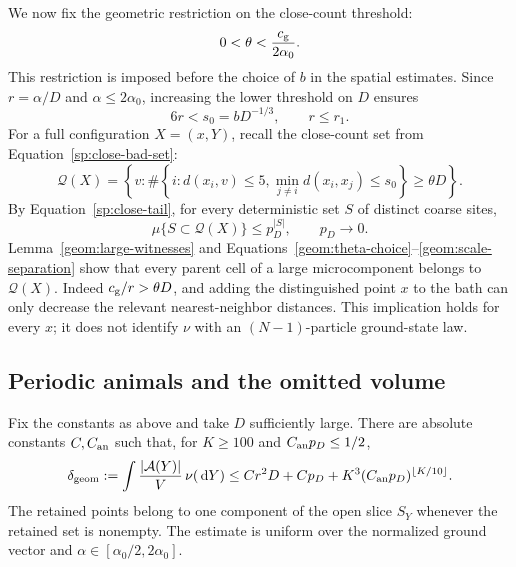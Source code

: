 We now fix the geometric restriction on the close-count threshold:
\begin{equation}\label{geom:theta-choice}
 0<\theta<\frac{c_{\rm g}}{2\alpha_0}.
\end{equation}
This restriction is imposed before the choice of $b$ in the spatial
estimates. Since $r=\alpha/D$ and $\alpha\le2\alpha_0$, increasing
the lower threshold on $D$ ensures
\begin{equation}\label{geom:scale-separation}
 6r<s_0=bD^{-1/3},\qquad r\le r_1.
\end{equation}
For a full configuration $X=(x,Y)$, recall the close-count set from
Equation~\eqref{sp:close-bad-set}:
\begin{equation}\label{geom:coarse-bad-set}
 \mathcal Q(X)
 =\left\{v:\#\left\{i:d(x_i,v)\le5,
                    \min_{j\ne i}d(x_i,x_j)\le s_0\right\}
                   \ge\theta D\right\}.
\end{equation}
By Equation~\eqref{sp:close-tail}, for every deterministic set $S$ of
distinct coarse sites,
\begin{equation}\label{geom:coarse-joint-bound}
 \mu\{S\subset\mathcal Q(X)\}\le p_D^{|S|},
 \qquad p_D\longrightarrow0.
\end{equation}
Lemma~\ref{geom:large-witnesses} and
Equations~\eqref{geom:theta-choice}--\eqref{geom:scale-separation}
show that every parent cell of a large microcomponent belongs to
$\mathcal Q(X)$. Indeed $c_{\rm g}/r>\theta D$, and adding
the distinguished point $x$ to the bath can only decrease the relevant
nearest-neighbor distances. This implication holds for every $x$; it does
not identify $\nu$ with an $(N-1)$-particle ground-state law.

\subsection{Periodic animals and the omitted volume}

\begin{proposition}\label{geom:omitted-volume}
Fix the constants as above and take $D$ sufficiently large. There are
absolute constants $C,C_{\rm an}$ such that, for $K\ge100$ and
$C_{\rm an}p_D\le1/2$,
\begin{equation}\label{geom:volume-bound}
 \delta_{\rm geom}:=\int\frac{|\mathcal A(Y)|}{V}\,\nu(\,\mathrm d Y)
 \le C r^2D+C p_D
       +K^3(C_{\rm an}p_D)^{\lfloor K/10\rfloor}.
\end{equation}
The retained points belong to one component of the open slice
$S_Y$ whenever the retained set is nonempty. The estimate is uniform
over the normalized ground vector and $\alpha\in[\alpha_0/2,2\alpha_0]$.
\end{proposition}

